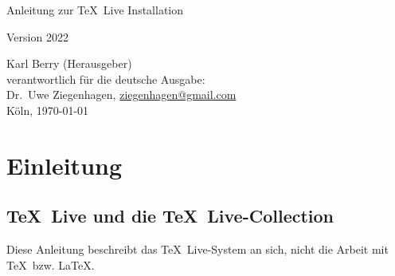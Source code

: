 \documentclass[12pt,ngerman,a4paper,fullparskip]{scrreprt}
\newcommand{\tlcurrentyear}{2022}
\newcommand{\TL}{\TeX\ Live\xspace}
\begin{document}
\begin{titlepage}

\begin{center}
\vspace*{3cm}

 \Huge Anleitung zur \TL Installation \vspace*{1cm}

\Large Version \tlcurrentyear

\end{center}

\vfill \noindent Karl Berry (Herausgeber) \\
verantwortlich für die deutsche Ausgabe:\\ 
Dr.~Uwe Ziegenhagen, \href{mailto:ziegenhagen@gmail.com}{ziegenhagen@gmail.com} \\
Köln, \today
\end{titlepage}


\tableofcontents



\listoffigures



%
%


\chapter{Einleitung}\label{sec:intro}
\section{\TL und die \TL-Collection}

Diese Anleitung beschreibt das \TL-System an sich, nicht die Arbeit mit \TeX\ bzw. \LaTeX. 
\end{document}
